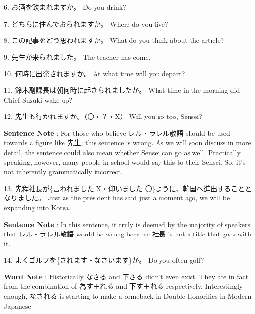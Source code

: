 \par{6. お酒を飲まれますか。 \hfill\break
Do you drink? }

\par{7. どちらに住んでおられますか。 \hfill\break
Where do you live? }

\par{8. この記事をどう思われますか。 \hfill\break
What do you think about the article? }

\par{9. 先生が来られました。 \hfill\break
The teacher has come. }

\par{10. 何時に出発されますか。 \hfill\break
At what time will you depart? }

\par{11. 鈴木副課長は朝何時に起きられましたか。 \hfill\break
What time in the morning did Chief Suzuki wake up? }

\par{12. 先生も行かれますか。（〇・？・X） \hfill\break
Will you go too, Sensei? }

\par{\textbf{Sentence Note }: For those who believe レル・ラレル敬語 should be used towards a figure like 先生, this sentence is wrong. As we will soon discuss in more detail, the sentence could also mean whether Sensei can go as well. Practically speaking, however, many people in school would say this to their Sensei. So, it's not inherently grammatically incorrect. }

\par{13. 先程社長が\{言われました X・仰いました 〇\}ように、韓国へ進出することとなりました。 \hfill\break
Just as the president has said just a moment ago, we will be expanding into Korea. }

\par{\textbf{Sentence Note }: In this sentence, it truly is deemed by the majority of speakers that レル・ラレル敬語 would be wrong because 社長 is not a title that goes with it. }

\par{14. よくゴルフを\{されます・なさいます\}か。 \hfill\break
Do you often golf? }

\par{\textbf{Word Note }: Historically なさる and 下さる didn't even exist. They are in fact from the combination of 為す＋れる and 下す＋れる respectively. Interestingly enough, なされる is starting to make a comeback in Double Honorifics in Modern Japanese. }

